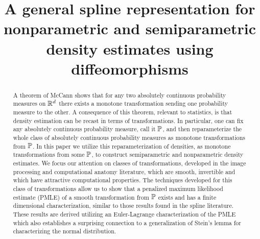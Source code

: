 \documentclass[noinfoline]{imsart}
\begin{document}



\begin{frontmatter}

\title{A general spline representation for nonparametric and semiparametric density estimates using diffeomorphisms}


\begin{abstract}
A theorem of McCann \cite{mcc:95} shows that for any two absolutely continuous probability measures on $\Bbb R^d$ there exists a monotone transformation sending one probability measure to the other. 
A consequence of this theorem, relevant to statistics,  is that density estimation can be recast in terms of transformations. In particular, one can fix any absolutely continuous probability measure, call it $\Bbb P$, and then reparameterize the whole class of absolutely continuous probability measures as monotone transformations from $\Bbb P$.
In this paper we utilize this reparameterization of densities, as monotone transformations from some $\Bbb P$, to construct semiparametric and nonparametric density estimates. We focus our attention on classes of transformations, developed in the image processing and computational anatomy literature,  which are smooth,  invertible and which have attractive computational properties. 
 The techniques developed for this class of transformations allow us to show that a penalized maximum likelihood estimate (PMLE) of a smooth transformation from $\Bbb P$ exists and has a finite dimensional characterization, similar to those results found in the spline literature. 
 These results are derived utilizing  an Euler-Lagrange characterization of the PMLE which also establishes a surprising connection to a generalization of Stein's lemma for characterizing the normal distribution.
\end{abstract}

\begin{keyword}
\end{keyword}

\end{frontmatter}
\end{document}
